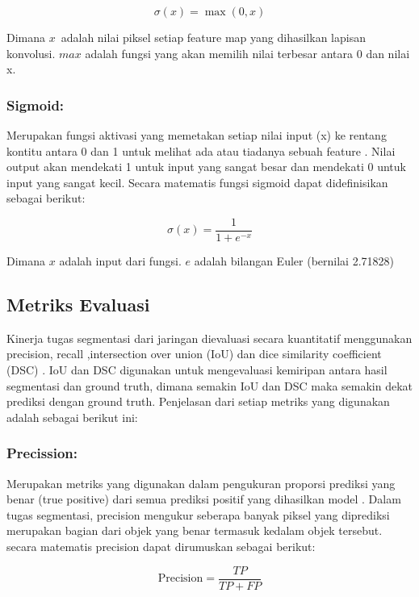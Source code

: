 \begin{equation}
	\sigma(x) = \max(0, x)
\end{equation}

Dimana \(x\)\ adalah nilai piksel setiap feature map yang dihasilkan lapisan konvolusi. \(max\) adalah fungsi yang akan memilih nilai terbesar antara 0 dan nilai x.

\subsubsection{Sigmoid:}
Merupakan fungsi aktivasi yang memetakan setiap nilai input (x) ke rentang kontitu antara 0 dan 1 untuk melihat ada atau tiadanya sebuah feature \cite{younisse_fine-tuning_2023}. Nilai output akan mendekati 1 untuk input yang sangat besar dan mendekati 0 untuk input yang sangat kecil. Secara matematis fungsi sigmoid dapat didefinisikan sebagai berikut:

\begin{equation}
	\sigma(x) = \frac{1}{1 + e^{-x}}
\end{equation}

Dimana \(x\) adalah input dari fungsi. \(e\) adalah bilangan Euler (bernilai 2.71828)


\subsection{Metriks Evaluasi}
\noindent Kinerja tugas segmentasi dari jaringan dievaluasi secara kuantitatif menggunakan precision, recall ,intersection over union (IoU) dan dice similarity coefficient (DSC) \cite{jiang_iu-net_2023}. IoU dan DSC digunakan untuk mengevaluasi kemiripan antara hasil segmentasi dan ground truth, dimana semakin IoU dan DSC maka semakin dekat prediksi dengan ground truth. Penjelasan dari setiap metriks yang digunakan adalah sebagai berikut ini:

\subsubsection{Precission:}
\noindent Merupakan metriks yang digunakan dalam pengukuran proporsi prediksi yang benar (true positive) dari semua prediksi positif yang dihasilkan model \cite{jiang_iu-net_2023}. Dalam tugas segmentasi, precision mengukur seberapa banyak piksel yang diprediksi merupakan bagian dari objek yang benar termasuk kedalam objek tersebut. secara matematis precision dapat dirumuskan sebagai berikut:

\begin{equation}
	\text{Precision} = \frac{TP}{TP + FP}
\end{equation}

